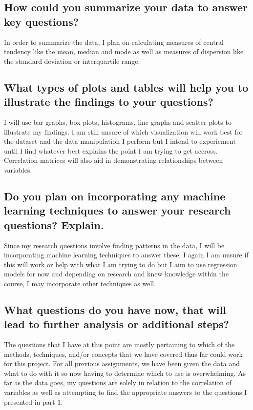 \documentclass[
]{article}
\begin{document}
\subsection{How could you summarize your data to answer key
questions?}\label{how-could-you-summarize-your-data-to-answer-key-questions}

In order to summarize the data, I plan on calculating measures of
central tendency like the mean, median and mode as well as measures of
dispersion like the standard deviation or interquartile range.

\subsection{What types of plots and tables will help you to illustrate
the findings to your
questions?}\label{what-types-of-plots-and-tables-will-help-you-to-illustrate-the-findings-to-your-questions}

I will use bar graphs, box plots, histograms, line graphs and scatter
plots to illustrate my findings. I am still unsure of which
visualization will work best for the dataset and the data manipulation I
perform but I intend to experiement until I find whatever best explains
the point I am trying to get accross. Correlation matrices will also aid
in demonstrating relationships between variables.

\subsection{Do you plan on incorporating any machine learning techniques
to answer your research questions?
Explain.}\label{do-you-plan-on-incorporating-any-machine-learning-techniques-to-answer-your-research-questions-explain.}

Since my research questions involve finding patterns in the data, I will
be incorporating machine learning techniques to answer these. I again I
am unsure if this will work or help with what I am trying to do but I
aim to use regression models for now and depending on research and knew
knowledge within the course, I may incorporate other techniques as well.

\subsection{What questions do you have now, that will lead to further
analysis or additional
steps?}\label{what-questions-do-you-have-now-that-will-lead-to-further-analysis-or-additional-steps}

The questions that I have at this point are mostly pertaining to which
of the methods, techniques, and/or concepts that we have covered thus
far could work for this project. For all previous assignments, we have
been given the data and what to do with it so now having to determine
which to use is overwhelming. As far as the data goes, my questions are
solely in relation to the correlation of variables as well as attempting
to find the appropriate answers to the questions I presented in part 1.
\end{document}
